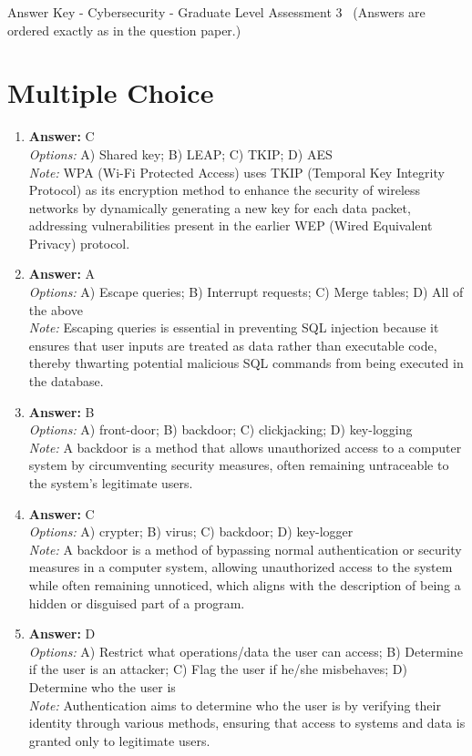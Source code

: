 \documentclass[12pt]{article}
\begin{document}
\begin{center}
Answer Key - Cybersecurity - Graduate Level Assessment 3 \
\small (Answers are ordered exactly as in the question paper.)
\end{center}

\section*{Multiple Choice}
\begin{enumerate}[label=\arabic*.]
\item \textbf{Answer:} C
\\ \textit{Options:} A) Shared key; B) LEAP; C) TKIP; D) AES
\\ \textit{Note:} WPA (Wi-Fi Protected Access) uses TKIP (Temporal Key Integrity Protocol) as its encryption method to enhance the security of wireless networks by dynamically generating a new key for each data packet, addressing vulnerabilities present in the earlier WEP (Wired Equivalent Privacy) protocol.
\item \textbf{Answer:} A
\\ \textit{Options:} A) Escape queries; B) Interrupt requests; C) Merge tables; D) All of the above
\\ \textit{Note:} Escaping queries is essential in preventing SQL injection because it ensures that user inputs are treated as data rather than executable code, thereby thwarting potential malicious SQL commands from being executed in the database.
\item \textbf{Answer:} B
\\ \textit{Options:} A) front-door; B) backdoor; C) clickjacking; D) key-logging
\\ \textit{Note:} A backdoor is a method that allows unauthorized access to a computer system by circumventing security measures, often remaining untraceable to the system's legitimate users.
\item \textbf{Answer:} C
\\ \textit{Options:} A) crypter; B) virus; C) backdoor; D) key-logger
\\ \textit{Note:} A backdoor is a method of bypassing normal authentication or security measures in a computer system, allowing unauthorized access to the system while often remaining unnoticed, which aligns with the description of being a hidden or disguised part of a program.
\item \textbf{Answer:} D
\\ \textit{Options:} A) Restrict what operations/data the user can access; B) Determine if the user is an attacker; C) Flag the user if he/she misbehaves; D) Determine who the user is
\\ \textit{Note:} Authentication aims to determine who the user is by verifying their identity through various methods, ensuring that access to systems and data is granted only to legitimate users.
\end{enumerate}
\end{document}
